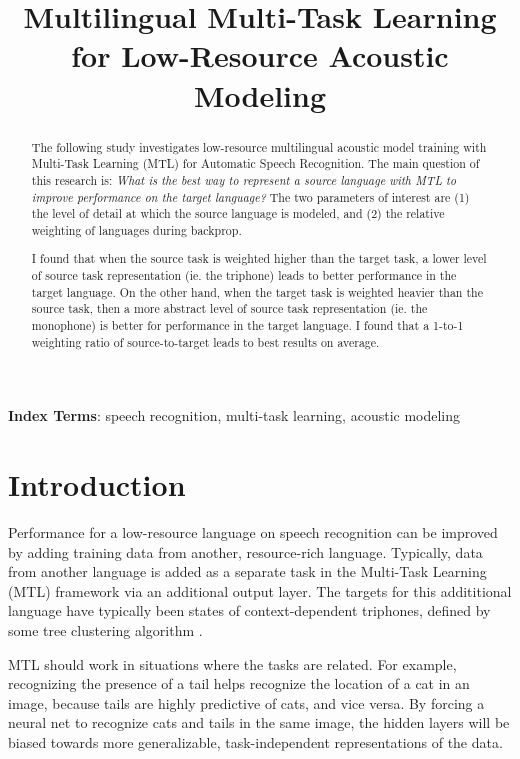 \documentclass[a4paper]{article}
\title{Multilingual Multi-Task Learning for Low-Resource Acoustic Modeling}
\begin{document}
\maketitle
% 
\begin{abstract}
  The following study investigates low-resource multilingual acoustic model training with Multi-Task Learning (MTL) for Automatic Speech Recognition. The main question of this research is: \textit{What is the best way to represent a source language with MTL to improve performance on the target language?} The two parameters of interest are (1) the level of detail at which the source language is modeled, and (2) the relative weighting of languages during backprop.

  I found that when the source task is weighted higher than the target task, a lower level of source task representation (ie. the triphone) leads to better performance in the target language.  On the other hand, when the target task is weighted heavier than the source task, then a more abstract level of source task representation (ie. the monophone) is better for performance in the target language. I found that a 1-to-1 weighting ratio of source-to-target leads to best results on average.

\end{abstract}

\noindent\textbf{Index Terms}: speech recognition, multi-task learning, acoustic modeling





\section{Introduction}

Performance for a low-resource language on speech recognition can be improved by adding training data from another, resource-rich language. Typically, data from another language is added as a separate task in the Multi-Task Learning (MTL) framework  \cite{caruana1997} via an additional output layer. The targets for this addititional language have typically been states of context-dependent triphones, defined by some tree clustering algorithm \cite{huang2013,heigold2013,grezl2016}.

MTL should work in situations where the tasks are related. For example, recognizing the presence of a tail helps recognize the location of a cat in an image, because tails are highly predictive of cats, and vice versa. By forcing a neural net to recognize cats and tails in the same image, the hidden layers will be biased towards more generalizable, task-independent representations of the data.
\end{document}
